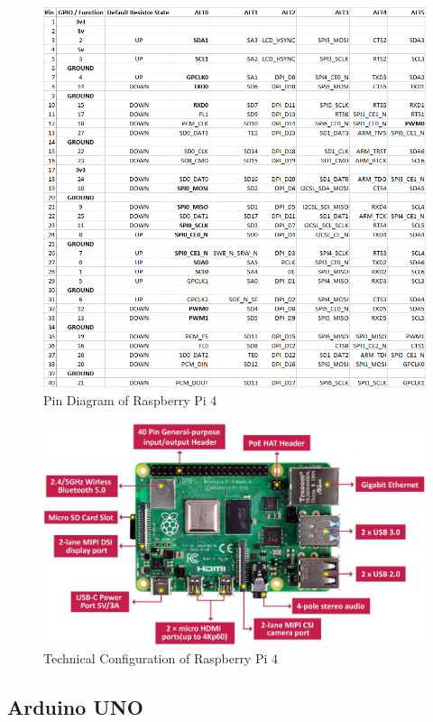 \begin{figure}[!ht]
\centering
\includegraphics[width=\linewidth]{figures/raspberry-pindiagram.png}
\caption{\label{img33} Pin Diagram of Raspberry Pi 4}
\end{figure}

\begin{figure}[!ht]
\centering
\includegraphics[width=\linewidth]{figures/Raspberry-Pi-pin.jpg}
\caption{\label{img34} Technical Configuration of Raspberry Pi 4}
\end{figure}


\subsection{Arduino UNO}

